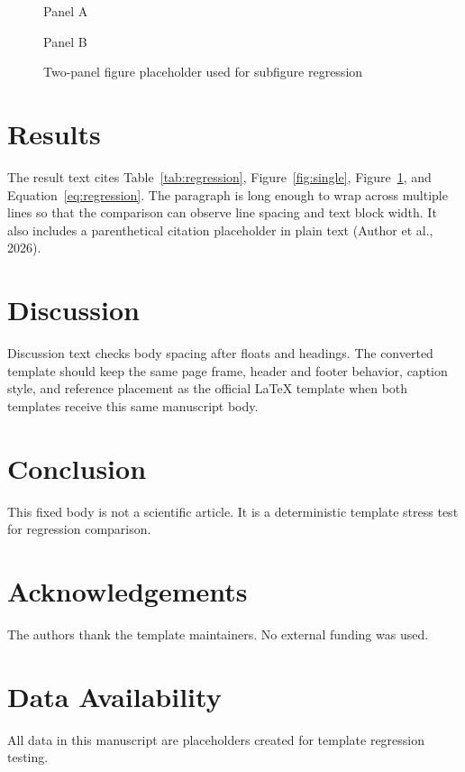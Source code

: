\begin{figure}[htbp]
\centering
\begin{minipage}{0.46\linewidth}
\centering
\fbox{\rule{0pt}{25mm}\rule{0.82\linewidth}{0pt}}
\par\small Panel A
\end{minipage}\hfill
\begin{minipage}{0.46\linewidth}
\centering
\fbox{\rule{0pt}{25mm}\rule{0.82\linewidth}{0pt}}
\par\small Panel B
\end{minipage}
\caption{Two-panel figure placeholder used for subfigure regression}
\label{fig:paired}
\end{figure}

\section{Results}
The result text cites Table~\ref{tab:regression}, Figure~\ref{fig:single}, Figure~\ref{fig:paired}, and Equation~\ref{eq:regression}. The paragraph is long enough to wrap across multiple lines so that the comparison can observe line spacing and text block width. It also includes a parenthetical citation placeholder in plain text (Author et al., 2026).

\section{Discussion}
Discussion text checks body spacing after floats and headings. The converted template should keep the same page frame, header and footer behavior, caption style, and reference placement as the official LaTeX template when both templates receive this same manuscript body.

\section{Conclusion}
This fixed body is not a scientific article. It is a deterministic template stress test for regression comparison.

\section*{Acknowledgements}
The authors thank the template maintainers. No external funding was used.

\section*{Data Availability}
All data in this manuscript are placeholders created for template regression testing.

